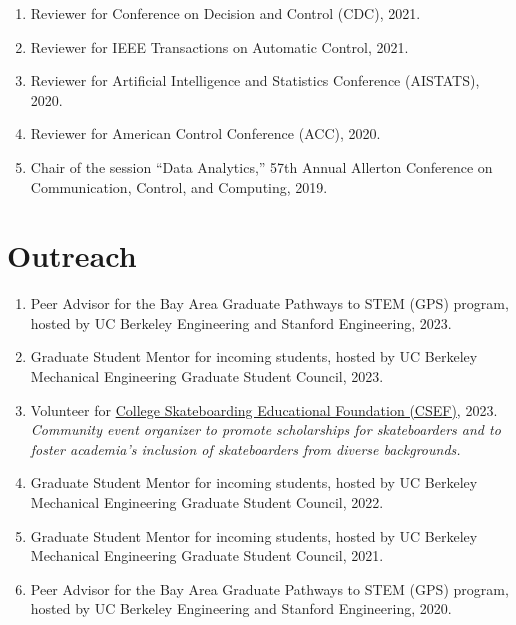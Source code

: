 \documentclass[11pt]{article}
\begin{document}
\begin{enumerate}[label={\arabic*.}]
		\item Reviewer for Conference on Decision and Control (CDC), 2021.
		\item Reviewer for IEEE Transactions on Automatic Control, 2021.
		\item Reviewer for Artificial Intelligence and Statistics Conference (AISTATS), 2020.
		\item Reviewer for American Control Conference (ACC), 2020.
		\item Chair of the session ``Data Analytics,'' 57th Annual Allerton Conference on Communication, Control, and Computing, 2019.
	\end{enumerate}
	
	\section{Outreach}
	\begin{enumerate}[label={\arabic*.}]
		\item Peer Advisor for the Bay Area Graduate Pathways to STEM (GPS) program, hosted by UC Berkeley Engineering and Stanford Engineering, 2023.
		\item Graduate Student Mentor for incoming students, hosted by UC Berkeley Mechanical Engineering Graduate Student Council, 2023.
		\item Volunteer for \href{https://www.collegeskateboarding.com/}{College Skateboarding Educational Foundation (CSEF)}, 2023. \\
		\textit{Community event organizer to promote scholarships for skateboarders and to foster academia's inclusion of skateboarders from diverse backgrounds.}
		\item Graduate Student Mentor for incoming students, hosted by UC Berkeley Mechanical Engineering Graduate Student Council, 2022.
		\item Graduate Student Mentor for incoming students, hosted by UC Berkeley Mechanical Engineering Graduate Student Council, 2021.
		\item Peer Advisor for the Bay Area Graduate Pathways to STEM (GPS) program, hosted by UC Berkeley Engineering and Stanford Engineering, 2020.
	\end{enumerate}
	
\end{document}
